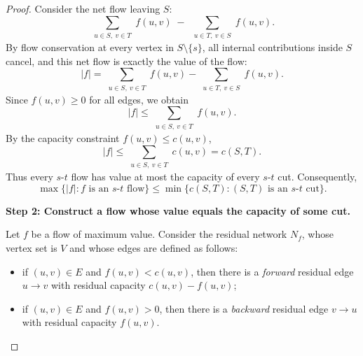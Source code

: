 \documentclass[11pt, a4paper]{ctexrep}
\begin{document}
\begin{proof}
    Consider the net flow leaving $S$:
    \[
        \sum_{\substack{u\in S,\ v\in T}} f(u,v)
        \;-\;
        \sum_{\substack{u\in T,\ v\in S}} f(u,v).
    \]
    By flow conservation at every vertex in $S\setminus\{s\}$, all internal contributions
    inside $S$ cancel, and this net flow is exactly the value of the flow:
    \[
        |f|
        =
        \sum_{\substack{u\in S,\ v\in T}} f(u,v)
        -
        \sum_{\substack{u\in T,\ v\in S}} f(u,v).
    \]
    Since $f(u,v)\ge 0$ for all edges, we obtain
    \[
        |f|
        \le
        \sum_{\substack{u\in S,\ v\in T}} f(u,v).
    \]
    By the capacity constraint $f(u,v)\le c(u,v)$,
    \[
        |f|
        \le
        \sum_{\substack{u\in S,\ v\in T}} c(u,v)
        =
        c(S,T).
    \]
    Thus every $s$-$t$ flow has value at most the capacity of every $s$-$t$ cut.
    Consequently,
    \[
        \max\{|f|: f \text{ is an $s$-$t$ flow}\}
        \le
        \min\{c(S,T): (S,T)\text{ is an $s$-$t$ cut}\}.
    \]

    \medskip
    \noindent
    \textbf{Step 2: Construct a flow whose value equals the capacity of some cut.}

    Let $f$ be a flow of maximum value.
    Consider the residual network $N_f$, whose vertex set is $V$ and whose edges are
    defined as follows:

    \begin{itemize}
        \item if $(u,v)\in E$ and $f(u,v)<c(u,v)$, then there is a \emph{forward} residual
              edge $u\to v$ with residual capacity $c(u,v)-f(u,v)$;
        \item if $(u,v)\in E$ and $f(u,v)>0$, then there is a \emph{backward} residual
              edge $v\to u$ with residual capacity $f(u,v)$.
    \end{itemize}

    \begin{center}
\end{center}
\end{proof}
\end{document}
